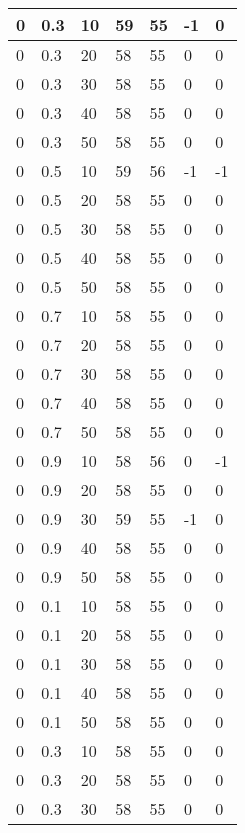 \begin{longtable}{|l|l|l|l|l|l|l|}
		0     & 0.3 & 10   & 59 & 55 & -1  & 0   \\ \hline
		0     & 0.3 & 20   & 58 & 55 & 0   & 0   \\ \hline
		0     & 0.3 & 30   & 58 & 55 & 0   & 0   \\ \hline
		0     & 0.3 & 40   & 58 & 55 & 0   & 0   \\ \hline
		0     & 0.3 & 50   & 58 & 55 & 0   & 0   \\ \hline
		0     & 0.5 & 10   & 59 & 56 & -1  & -1  \\ \hline
		0     & 0.5 & 20   & 58 & 55 & 0   & 0   \\ \hline
		0     & 0.5 & 30   & 58 & 55 & 0   & 0   \\ \hline
		0     & 0.5 & 40   & 58 & 55 & 0   & 0   \\ \hline
		0     & 0.5 & 50   & 58 & 55 & 0   & 0   \\ \hline
		0     & 0.7 & 10   & 58 & 55 & 0   & 0   \\ \hline
		0     & 0.7 & 20   & 58 & 55 & 0   & 0   \\ \hline
		0     & 0.7 & 30   & 58 & 55 & 0   & 0   \\ \hline
		0     & 0.7 & 40   & 58 & 55 & 0   & 0   \\ \hline
		0     & 0.7 & 50   & 58 & 55 & 0   & 0   \\ \hline
		0     & 0.9 & 10   & 58 & 56 & 0   & -1  \\ \hline
		0     & 0.9 & 20   & 58 & 55 & 0   & 0   \\ \hline
		0     & 0.9 & 30   & 59 & 55 & -1  & 0   \\ \hline
		0     & 0.9 & 40   & 58 & 55 & 0   & 0   \\ \hline
		0     & 0.9 & 50   & 58 & 55 & 0   & 0   \\ \hline
		0     & 0.1 & 10   & 58 & 55 & 0   & 0   \\ \hline
		0     & 0.1 & 20   & 58 & 55 & 0   & 0   \\ \hline
		0     & 0.1 & 30   & 58 & 55 & 0   & 0   \\ \hline
		0     & 0.1 & 40   & 58 & 55 & 0   & 0   \\ \hline
		0     & 0.1 & 50   & 58 & 55 & 0   & 0   \\ \hline
		0     & 0.3 & 10   & 58 & 55 & 0   & 0   \\ \hline
		0     & 0.3 & 20   & 58 & 55 & 0   & 0   \\ \hline
		0     & 0.3 & 30   & 58 & 55 & 0   & 0   \\ \hline

\end{longtable}
